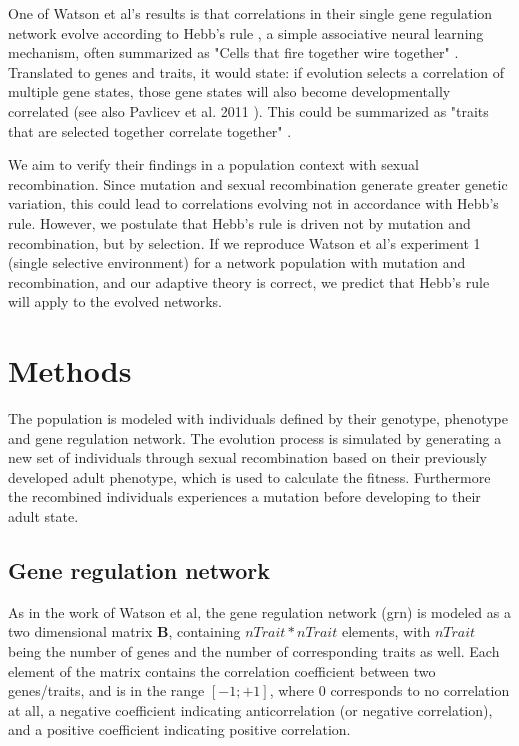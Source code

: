 \documentclass{article}
\begin{document}
One of Watson et al's results is that correlations in their single gene regulation network evolve according to Hebb’s rule \cite{hebb}, a simple associative neural learning mechanism, often summarized as "Cells that fire together wire together" \cite{shatz1992}.
Translated to genes and traits, it would state: if evolution selects a correlation of multiple gene states, those gene states will also become developmentally correlated (see also Pavlicev et al. 2011 \cite{pavlicev2011}).
This could be summarized as "traits that are selected together correlate together" \cite{watson2014}.

We aim to verify their findings in a population context with sexual recombination.
Since mutation and sexual recombination generate greater genetic variation, this could lead to correlations evolving not in accordance with Hebb's rule. However, we postulate that Hebb’s rule is driven not by mutation and recombination, but by selection.
If we reproduce Watson et al’s experiment 1 (single selective environment) for a network population with mutation and recombination, and our adaptive theory is correct, we predict that Hebb’s rule will apply to the evolved networks.

\section{Methods}

The population is modeled with individuals defined by their genotype, phenotype and gene regulation network. 
The evolution process is simulated by generating a new set of individuals through sexual recombination based on their previously developed adult phenotype, which is used to calculate the fitness. Furthermore the recombined individuals experiences a mutation before developing to their adult state.


\subsection{Gene regulation network}

As in the work of Watson et al, the gene regulation network (grn) is modeled as a two dimensional matrix $\bm{B}$, containing $nTrait * nTrait$ elements, with $nTrait$ being the number of genes and the number of corresponding traits as well.
Each element of the matrix contains the correlation coefficient between two genes/traits, and is in the range $[-1; +1]$, where 0 corresponds to no correlation at all, a negative coefficient indicating anticorrelation (or negative correlation), and a positive coefficient indicating positive correlation.
\end{document}

